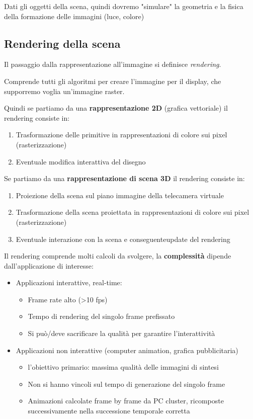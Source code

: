\documentclass[a4paper, 10pt]{article}
\begin{document}
		\noindent
		Dati gli oggetti della scena, quindi dovremo "simulare" la geometria
		e la fisica della formazione delle immagini (luce, colore)
		
	\subsection{Rendering della scena}
		Il passaggio dalla rappresentazione all'immagine si definisce
		\textit{rendering}.
		
		\noindent
		Comprende tutti gli algoritmi per creare l'immagine per il
		display, che supporremo voglia un'immagine raster.
		
		\noindent
		Quindi se partiamo da una \textbf{rappresentazione 2D} (grafica
		vettoriale) il rendering consiste in:
		\begin{enumerate}
			\item Trasformazione delle primitive in rappresentazioni di colore sui pixel
			(rasterizzazione)
			\item Eventuale modifica interattiva del disegno
		\end{enumerate}
		Se partiamo da una \textbf{rappresentazione di scena 3D} il rendering consiste in:
		\begin{enumerate}
			\item Proiezione della scena sul piano immagine della telecamera virtuale
			\item Trasformazione della scena proiettata in rappresentazioni di colore
			sui pixel (rasterizzazione)
			\item Eventuale interazione con la scena e conseguenteupdate del
			rendering
		\end{enumerate}
		
		Il rendering comprende molti calcoli da svolgere, la \textbf{complessità} dipende dall'applicazione di interesse:
		\begin{itemize}
			\item Applicazioni interattive, real-time:
			\begin{itemize}
				\item Frame rate alto (>10 fps)
				\item Tempo di rendering del singolo frame prefissato
				\item Si può/deve sacrificare la qualità per garantire l’interattività
			\end{itemize}
			\item Applicazioni non interattive (computer animation, grafica
			pubblicitaria)
			\begin{itemize}
				\item l'obiettivo primario: massima qualità delle immagini di sintesi
				\item Non si hanno vincoli sul tempo di generazione del singolo frame
				\item Animazioni calcolate frame by frame da PC cluster, ricomposte
				successivamente nella successione temporale corretta
			\end{itemize}
		\end{itemize}
		
\end{document}
